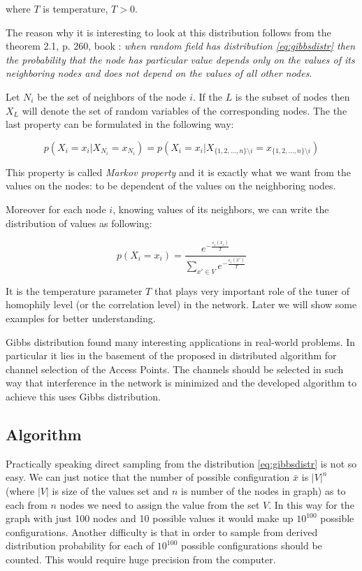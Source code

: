 \documentclass[12pt]{report}
\begin{document}
where $T$ is temperature, $T > 0$.


The reason why it is interesting to look at this distribution follows from the theorem 2.1, p. 260, book \cite{bremaud2013markov}: \textit{when random field has distribution \ref{eq:gibbsdistr} then the probability that the node has particular value depends only on the values of its neighboring nodes and does not depend on the values of all other nodes}.

Let $N_i$ be the set of neighbors of the node $i$. If the $L$ is the subset of nodes then $X_{L}$ will denote the set of random variables of the corresponding nodes. 
The the last property can be formulated in the following way:

$$ p(X_i = x_i | X_{N_i} = x_{N_i}) = p(X_i = x_i | X_{\lbrace 1, 2, ..., n\rbrace \setminus i} = x_{\lbrace 1, 2, ..., n \rbrace \setminus i}) $$

This property is called \textit{Markov property} and it is exactly what we want from the values on the nodes: to be dependent of the values on the neighboring nodes.

Moreover for each node $i$, knowing values of its neighbors, we can write the distribution of values as following:

$$ p(X_i = x_i) = \frac{ e^{-\frac{\varepsilon_i(x_i)}{T}} }{ \sum\limits_{x'\in V} e^{-\frac{\varepsilon_i(x')}{T}}} $$

It is the temperature parameter $T$ that plays very important role of the tuner of homophily level (or the correlation level) in the network. Later we will show some examples for better understanding. 


Gibbs distribution found many interesting applications in real-world problems. In particular it lies in the basement of the proposed in \cite{kauffmann2007measurement} distributed algorithm for channel selection of the Access Points. The channels should be selected in such way that interference in the network is minimized and the developed algorithm to achieve this uses Gibbs distribution. 

\subsection{Algorithm} 
\label{subsec:Algorithm}
Practically speaking direct sampling from the distribution \ref{eq:gibbsdistr} is not so easy. We can just notice that the number of possible configuration $\bar{x}$ is $|V|^n$ (where $|V|$ is size of the values set and $n$ is number of the nodes in graph) as to each from $n$ nodes we need to assign the value from the set $V$. 
In this way for the graph with just 100 nodes and 10 possible values it would make up $10^{100}$ possible configurations. Another difficulty is that in order to sample from derived distribution probability for each of $10^{100}$ possible configurations should be counted. This would require huge precision from the computer.
\end{document}
